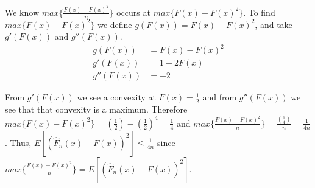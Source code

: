 We know $max\{\frac{F(x)-F(x)^2}{n}\}$ occurs at $max\{F(x)-F(x)^2\}$.
To find $max\{F(x)-F(x)^2\}$ we define $g(F(x))= F(x) - F(x)^2$, and take $g'(F(x))$ and $g''(F(x))$.
\begin{align*}
    g(F(x)) &= F(x) - F(x)^2 \\
    g'(F(x)) &= 1 - 2F(x) \\
    g''(F(x)) &= -2
\end{align*}

From $g'(F(x))$ we see a convexity at $F(x)=\frac{1}{2}$ and from $g''(F(x))$ we see that that convexity is a maximum.
Therefore $max\{F(x)-F(x)^2\} = (\frac{1}{2}) - (\frac{1}{2})^4 = \frac{1}{4}$ and $max\{\frac{F(x)-F(x)^2}{n}\} = \frac{(\frac{1}{4})}{n} = \frac{1}{4n}$.
Thus, $E[(\hat{F}_n(x) - F(x))^2] \leq \frac{1}{4n}$ since $max\{\frac{F(x)-F(x)^2}{n}\} = E[(\hat{F}_n(x) - F(x))^2]$.

 





